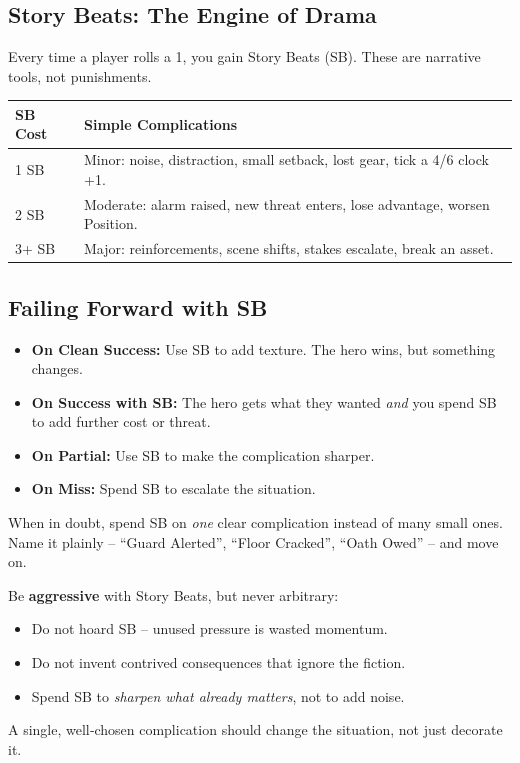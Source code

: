 \subsection{Story Beats: The Engine of Drama}

Every time a player rolls a 1, you gain Story Beats (SB). These are narrative tools, not punishments.

\begin{tcolorbox}[title=SB Spend Menu, colback=white!97!gray, colframe=black!80!gray]
\begin{tabularx}{\textwidth}{lX}
\toprule
\textbf{SB Cost} & \textbf{Simple Complications} \\
\midrule
1 SB & Minor: noise, distraction, small setback, lost gear, tick a 4/6 clock +1. \\
2 SB & Moderate: alarm raised, new threat enters, lose advantage, worsen Position. \\
3+ SB & Major: reinforcements, scene shifts, stakes escalate, break an asset. \\
\bottomrule
\end{tabularx}
\end{tcolorbox}

\subsection{Failing Forward with SB}
\begin{itemize}
\item \textbf{On Clean Success:} Use SB to add texture. The hero wins, but something changes.
\item \textbf{On Success with SB:} The hero gets what they wanted \emph{and} you spend SB to add further cost or threat.
\item \textbf{On Partial:} Use SB to make the complication sharper.
\item \textbf{On Miss:} Spend SB to escalate the situation.
\end{itemize}

\begin{tcolorbox}[colback=gray!5,colframe=gray!75!black,title=\textbf{Lane Marker: One Complication per Roll}]
When in doubt, spend SB on \emph{one} clear complication instead of many small ones.  
Name it plainly – “Guard Alerted”, “Floor Cracked”, “Oath Owed” – and move on.

Be \textbf{aggressive} with Story Beats, but never arbitrary:
\begin{itemize}[noitemsep]
\item Do not hoard SB – unused pressure is wasted momentum.
\item Do not invent contrived consequences that ignore the fiction.
\item Spend SB to \emph{sharpen what already matters}, not to add noise.
\end{itemize}
A single, well‑chosen complication should change the situation, not just decorate it.
\end{tcolorbox}


